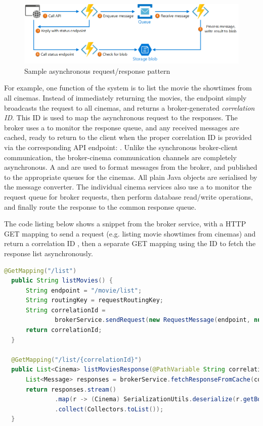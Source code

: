 \begin{figure}[H]
	\centering
	\includegraphics[width=0.8\linewidth]{./assets/images/case-studies/async-req-res.png}
	\caption{Sample asynchronous request/response pattern}
	\label{fig:async-req-res}
\end{figure}

For example, one function of the system is to list the movie the showtimes from all cinemas. Instead of immediately returning the movies, the  endpoint simply broadcasts the request to all cinemas, and returns a broker-generated \textit{correlation ID}. This ID is used to map the asynchronous request to the responses. The broker uses a  to monitor the response queue, and any received messages are cached, ready to return to the client when the proper correlation ID is provided via the corresponding API endpoint: . Unlike the synchronous broker-client communication, the broker-cinema communication channels are completely asynchronous. A  and  are used to format messages from the broker, and published to the appropriate queues for the cinemas. All plain Java objects are serialised by the message converter. The individual cinema services also use a  to monitor the request queue for broker requests, then perform database read/write operations, and finally route the response to the common response queue.

The code listing below shows a snippet from the broker service, with a HTTP GET mapping to send a request (e.g. listing movie showtimes from cinemas) and return a correlation ID , then a separate GET mapping using the ID to fetch the response list asynchronously.


\begin{lstlisting}[language=Java, caption=Code snippet from \code{MovieController.java} in \code{broker-service}]
  @GetMapping("/list")
  public String listMovies() {
      String endpoint = "/movie/list";
      String routingKey = requestRoutingKey;
      String correlationId =
              brokerService.sendRequest(new RequestMessage(endpoint, null), routingKey);
      return correlationId;
  }

  @GetMapping("/list/{correlationId}")
  public List<Cinema> listMoviesResponse(@PathVariable String correlationId) {
      List<Message> responses = brokerService.fetchResponseFromCache(correlationId);
      return responses.stream()
              .map(r -> (Cinema) SerializationUtils.deserialize(r.getBody()))
              .collect(Collectors.toList());
  }
\end{lstlisting}

